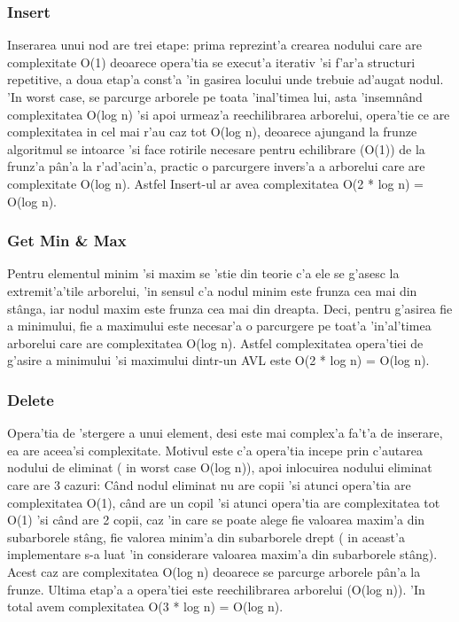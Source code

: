 \subsubsection{Insert}
Inserarea unui nod are trei etape: prima reprezint'a crearea nodului care are complexitate O(1) deoarece opera'tia se execut'a iterativ 'si f'ar'a structuri repetitive, a doua etap'a const'a 'in gasirea locului unde trebuie ad'augat nodul. 'In worst case, se parcurge arborele pe toata 'inal'timea lui, asta 'insemn\^and complexitatea O(log n) 'si apoi urmeaz'a reechilibrarea arborelui, opera'tie ce are complexitatea in cel mai r'au caz tot O(log n), deoarece ajungand la frunze algoritmul se intoarce 'si face rotirile necesare pentru echilibrare (O(1)) de la frunz'a p\^an'a la r'ad'acin'a, practic o parcurgere invers'a a arborelui care are complexitate O(log n). Astfel Insert-ul ar avea complexitatea O(2 * log  n) = O(log n).
\vspace{5 mm}
\subsubsection{Get Min \& Max}
Pentru elementul minim 'si maxim se 'stie din teorie c'a ele se g'asesc la extremit'a'tile arborelui, 'in sensul c'a nodul minim este frunza cea mai din st\^anga, iar nodul maxim este frunza cea mai din dreapta. Deci, pentru g'asirea fie a minimului, fie a maximului este necesar'a o parcurgere pe toat'a 'in'al'timea arborelui care are complexitatea O(log n). Astfel complexitatea opera'tiei de g'asire a minimului 'si maximului dintr-un AVL este  O(2 * log  n) = O(log n).
\vspace{5 mm}
\subsubsection{Delete}
Opera'tia de 'stergere a unui element, desi este mai complex'a fa't'a de inserare, ea are aceea'si complexitate. Motivul este c'a opera'tia incepe prin c'autarea nodului de eliminat ( in worst case O(log n)), apoi inlocuirea nodului eliminat care are 3 cazuri: C\^and nodul eliminat nu are copii 'si atunci opera'tia are complexitatea O(1), c\^and are un copil 'si atunci opera'tia are complexitatea tot O(1) 'si c\^and are 2 copii, caz 'in care se poate alege fie valoarea maxim'a din subarborele st\^ang, fie valorea minim'a din subarborele drept ( in aceast'a implementare s-a luat 'in considerare valoarea maxim'a din subarborele st\^ang). Acest caz are complexitatea O(log n) deoarece se parcurge arborele p\^an'a la frunze. Ultima etap'a a opera'tiei este reechilibrarea arborelui (O(log n)). 'In total avem complexitatea O(3 * log n) = O(log n).
\vspace{5 mm}
